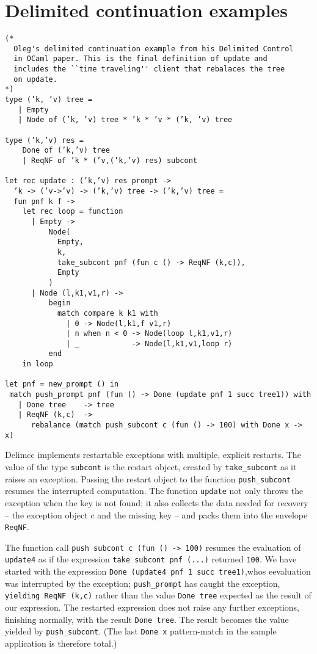 \documentclass{article}
\begin{document}
\section{Delimited continuation examples}
\lstset{language=[Objective]Caml}\begin{lstlisting}
(*
  Oleg's delimited continuation example from his Delimited Control
  in OCaml paper. This is the final definition of update and
  includes the ``time traveling'' client that rebalaces the tree
  on update.
*)
type (’k, ’v) tree =
   | Empty
   | Node of (’k, ’v) tree * ’k * ’v * (’k, ’v) tree

type (’k,’v) res =
    Done of (’k,’v) tree
    | ReqNF of ’k * (’v,(’k,’v) res) subcont

let rec update : (’k,’v) res prompt ->
  ’k -> (’v->’v) -> (’k,’v) tree -> (’k,’v) tree =
  fun pnf k f ->
    let rec loop = function
      | Empty ->
          Node(
            Empty,
            k,
            take_subcont pnf (fun c () -> ReqNF (k,c)),
            Empty
          )
      | Node (l,k1,v1,r) ->
          begin
            match compare k k1 with
              | 0 -> Node(l,k1,f v1,r)
              | n when n < 0 -> Node(loop l,k1,v1,r)
              | _            -> Node(l,k1,v1,loop r)
          end
    in loop

let pnf = new_prompt () in
 match push_prompt pnf (fun () -> Done (update pnf 1 succ tree1)) with
   | Done tree    -> tree
   | ReqNF (k,c)  ->
      rebalance (match push_subcont c (fun () -> 100) with Done x -> x)
\end{lstlisting}

\break
\lstset{language=[Objective]Caml}
Delimcc implements restartable exceptions with multiple, explicit restarts. The value of the type \lstinline$subcont$ is the restart object, created by \lstinline$take_subcont$ as it raises an exception. Passing the restart object to the function \lstinline$push_subcont$ resumes the interrupted computation. The function \lstinline$update$ not only throws the exception when the key is not found; it also collects the data needed for recovery – the exception object c and the missing key – and packs them into the envelope \lstinline$ReqNF$.

The function call \lstinline$push subcont c (fun () -> 100)$ resumes the evaluation of \lstinline$update4$ as if the expression \lstinline$take subcont pnf (...)$ returned \lstinline$100$. We have started with the expression \lstinline$Done (update4 pnf 1 succ tree1)$,whos eevaluation was interrupted by the exception; \lstinline$push_prompt$ has caught the exception, \lstinline$yielding ReqNF (k,c)$ rather than the value \lstinline$Done tree$ expected as the result of our expression. The restarted expression does not raise any further exceptions, finishing normally, with the result \lstinline$Done tree$. The result becomes the value yielded by \lstinline$push_subcont$. (The last \lstinline$Done x$ pattern-match in the sample application is therefore total.)
\end{document}
